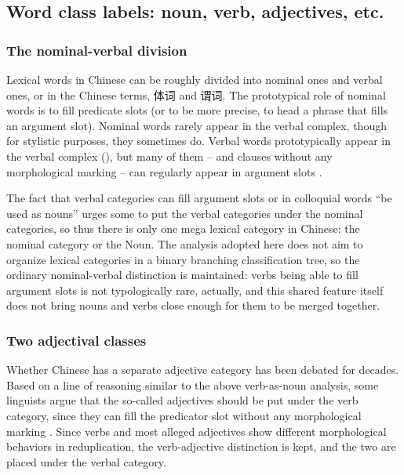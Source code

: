 \documentclass[UTF8, a4paper, oneside, scheme=plain]{ctexrep}
\newcommand*{\citesec}[1]{\S~{#1}}
\begin{document}
\subsection{Word class labels: noun, verb, adjectives, etc.}

\subsubsection{The nominal-verbal division}

Lexical words in Chinese can be roughly divided into nominal ones and verbal ones,
or in the Chinese terms, 体词 and 谓词.
The prototypical role of nominal words 
is to fill predicate slots (or to be more precise, to head a phrase that fills an argument slot).
Nominal words rarely appear in the verbal complex,
though for stylistic purposes, they sometimes do.
Verbal words prototypically appear in the verbal complex
(),
but many of them -- and clauses without any morphological marking -- 
can regularly appear in argument slots \citep[\citesec{3.5}]{zhudexigrammar}.

The fact that verbal categories can fill argument slots or in colloquial words ``be used as nouns''
urges some to put the verbal categories under the nominal categories,
so thus there is only one mega lexical category in Chinese:
the nominal category or the Noun.
The analysis adopted here does not aim to organize lexical categories 
in a binary branching classification tree,
so the ordinary nominal-verbal distinction is maintained:
verbs being able to fill argument slots is not typologically rare, actually,
and this shared feature itself does not bring nouns and verbs close enough 
for them to be merged together.

\subsubsection{Two adjectival classes}

Whether Chinese has a separate adjective category 
has been debated for decades.
Based on a line of reasoning similar to the above verb-as-noun analysis,
some linguists argue that the so-called adjectives should be put under the verb category,
since they can fill the predicator slot without any morphological marking \citep{li1989mandarin}.
Since verbs and most alleged adjectives show different morphological behaviors in reduplication, %
the verb-adjective distinction is kept,
and the two are placed under the verbal category.
\end{document}
